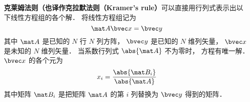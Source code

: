 

\textbf{克莱姆法则（也译作克拉默法则（Kramer's rule）}可以直接用行列式表示出以下线性方程组的各个解． 将线性方程组记为
\begin{equation}
\mat A \bvec x = \bvec y
\end{equation}
其中 $\mat A$ 是已知的 $N$ 行 $N$ 列方阵， $\bvec y$ 是已知的 $N$ 维列矢量， $\bvec x$ 是未知的 $N$ 维列矢量． 当系数行列式 $\abs{\mat A}$ 不为零时， 方程有唯一解． $\bvec x$ 的各个元为
\begin{equation}
x_i = \frac{\abs{\mat B_i}}{\abs{\mat A}}
\end{equation}
其中矩阵 $\mat B_i$ 是把矩阵 $\mat A$ 的第 $i$ 列替换为 $\bvec y$ 得到的矩阵．

